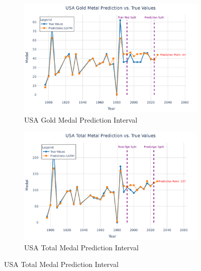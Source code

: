 \documentclass{mcmthesis}
\begin{document}
\begin{figure}[H]
	\centering
		\begin{subfigure}[b]{0.48\textwidth}
		\includegraphics[width=\textwidth]{fig/USA Gold Metal Prediction vs. True Values.png}
		\caption{USA Gold Medal Prediction Interval}
		\label{fig:usa_gold1}
	\end{subfigure}
	\hfill
	\begin{subfigure}[b]{0.48\textwidth}
		\includegraphics[width=\textwidth]{fig/USA Total Metal Prediction vs. True Values.png}
		\caption{USA Total Medal Prediction Interval}
		\label{fig:usa_total1}
	\end{subfigure}
	\label{fig:chn_usa_pred1}


\end{figure}
\end{document}
